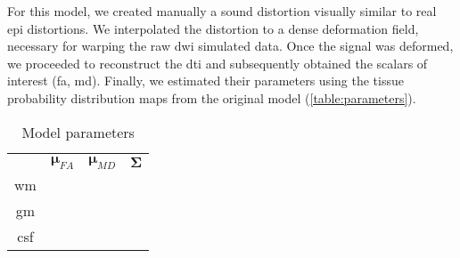 For this model, we created manually a sound distortion visually similar
to real \ac{epi} distortions. We interpolated the distortion to a 
dense deformation field, necessary for warping the raw \ac{dwi} simulated
data. Once the signal was deformed, we proceeded to reconstruct the
\ac{dti} and subsequently obtained the scalars of interest (\ac{fa}, \ac{md}).
Finally, we estimated their parameters using the tissue probability
distribution maps from the original model (\autoref{table:parameters}).

\begin{table}
\begin{tabular}{cccc}
         & $\mathbf{\mu}_{FA}$ & $\mathbf{\mu}_{MD}$ & $\mathbf{\Sigma}$ \\
\ac{wm}  & & & \\
\ac{gm}  & & & \\
\ac{csf} & & & \\
\end{tabular}
\caption{Model parameters}
\label{table:parameters}
\end{table}